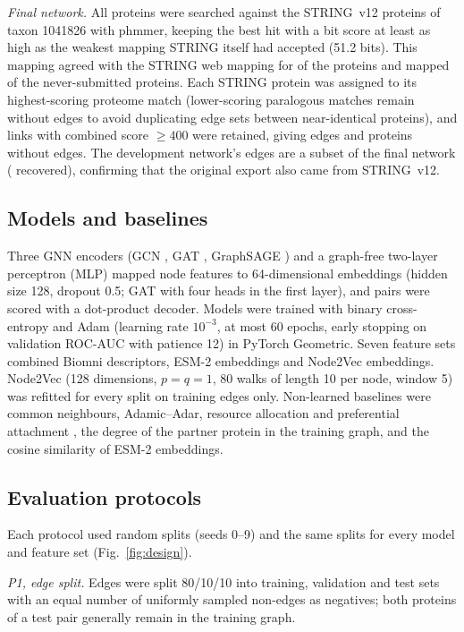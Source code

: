 \documentclass[pdflatex,sn-mathphys-num]{sn-jnl}
\begin{document}
\emph{Final network.} All \nProteins{} proteins were searched against the \nStringProteins{} STRING~v12 proteins of taxon 1041826 with phmmer, keeping the best hit with a bit score at least as high as the weakest mapping STRING itself had accepted (51.2 bits). This mapping agreed with the STRING web mapping for \mapAgree{} of the \nWebMapped{} proteins and mapped \nPhmmerNew{} of the \nNeverSubmitted{} never-submitted proteins. Each STRING protein was assigned to its highest-scoring proteome match (lower-scoring paralogous matches remain without edges to avoid duplicating edge sets between near-identical proteins), and links with combined score $\geq400$ were retained, giving \nEdgesFinal{} edges and \nIsoFinal{} proteins without edges. The development network's edges are a subset of the final network (\vTwelveRecovered{} recovered), confirming that the original export also came from STRING~v12.

\subsection{Models and baselines}
Three GNN encoders (GCN \cite{kipf2017gcn}, GAT \cite{velickovic2018gat}, GraphSAGE \cite{hamilton2017inductive}) and a graph-free two-layer perceptron (MLP) mapped node features to 64-dimensional embeddings (hidden size 128, dropout 0.5; GAT with four heads in the first layer), and pairs were scored with a dot-product decoder. Models were trained with binary cross-entropy and Adam (learning rate $10^{-3}$, at most 60 epochs, early stopping on validation ROC-AUC with patience 12) in PyTorch Geometric. Seven feature sets combined Biomni descriptors, ESM-2 embeddings and Node2Vec embeddings. Node2Vec \cite{grover2016node2vec} (128 dimensions, $p=q=1$, 80 walks of length 10 per node, window 5) was refitted for every split on training edges only. Non-learned baselines were common neighbours, Adamic--Adar, resource allocation and preferential attachment \cite{liben2003link,lu2011link}, the degree of the partner protein in the training graph, and the cosine similarity of ESM-2 embeddings.

\subsection{Evaluation protocols}\label{sec:protocols}
Each protocol used \nSeeds{} random splits (seeds 0--9) and the same splits for every model and feature set (Fig.~\ref{fig:design}).

\emph{P1, edge split.} Edges were split 80/10/10 into training, validation and test sets with an equal number of uniformly sampled non-edges as negatives; both proteins of a test pair generally remain in the training graph.
\end{document}
